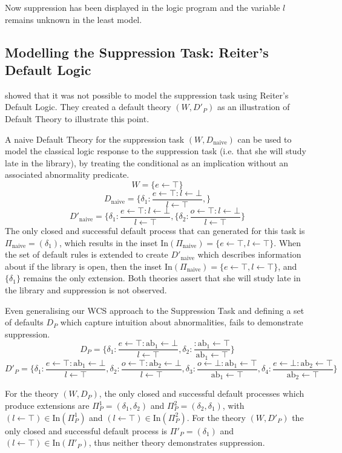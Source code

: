 Now suppression has been displayed in the logic program and the variable $l$ remains unknown in the least model.

\subsection{Modelling the Suppression Task: Reiter's Default Logic}
\cite{ragni2017formal} showed that it was not possible to model the suppression task using Reiter's Default Logic. They created a default theory $(W, D'_P)$ as an illustration of Default Theory to illustrate this point.

A naive Default Theory for the suppression task $(W,D_\text{naive})$ can be used to model the classical logic response to the suppression task (i.e. that she will study late in the library), by treating the conditional as an implication without an associated abnormality predicate.
\[
W=\{e\leftarrow \top\}
\]
\[
D_\text{naive}=\{\delta_1:\frac{e\leftarrow \top:l \leftarrow \bot}{l\leftarrow\top} ,
\}
\]
\[
D'_\text{naive}=\{\delta_1:\frac{e\leftarrow \top:l \leftarrow \bot}{l\leftarrow\top} ,
\{\delta_2:\frac{o\leftarrow \top:l \leftarrow \bot}{l\leftarrow\top}
\}
\]
The only closed and successful default process that can generated for this task is $\Pi_\text{naive}=(\delta_1)$, which results in the inset $\text{In}(\Pi_\text{naive})=\{e\leftarrow \top, l\leftarrow\top\}$. When the set of default rules is extended to create $D'_\text{naive}$ which describes information about if the library is open, then the inset $\text{In}(\Pi_\text{naive})=\{e\leftarrow \top, l\leftarrow\top\}$, and $\{\delta_1\}$ remains the only extension. Both theories assert that she will study late in the library and suppression is not observed.

Even generalising our WCS approach to the Suppression Task and defining a set of defaults $D_P$ which capture intuition about abnormalities, fails to demonstrate suppression.
\[
D_P=\{\delta_1:\frac{e\leftarrow \top:\text{ab}_1 \leftarrow \bot}{l\leftarrow\top} ,
\delta_2:\frac{:\text{ab}_1 \leftarrow \top}{\text{ab}_1\leftarrow\top}
\}
\]
\[
D'_P=\{\delta_1:\frac{e\leftarrow \top:\text{ab}_1 \leftarrow \bot}{l\leftarrow\top} ,
\delta_2:\frac{o\leftarrow \top:\text{ab}_2 \leftarrow \bot}{l\leftarrow\top},
\delta_3:\frac{o\leftarrow \bot:\text{ab}_1 \leftarrow \top}{\text{ab}_1\leftarrow\top},
\delta_4:\frac{e\leftarrow \bot:\text{ab}_2 \leftarrow \top}{\text{ab}_2\leftarrow\top}
\}
\]

For the theory $(W,D_P)$, the only closed and successful default processes which produce extensions are $\Pi_P^1=(\delta_1,\delta_2)$ and $\Pi^2_P=(\delta_2,\delta_1)$, with $(l\leftarrow \top)\in \text{In}(\Pi^1_P)$ and $(l\leftarrow \top)\in \text{In}(\Pi^2_P)$. For the theory $(W,D'_P)$ the only closed and successful default process is $\Pi'_P=(\delta_1)$ and $(l\leftarrow \top)\in \text{In}(\Pi'_P)$, thus neither theory demonstrates suppression.

